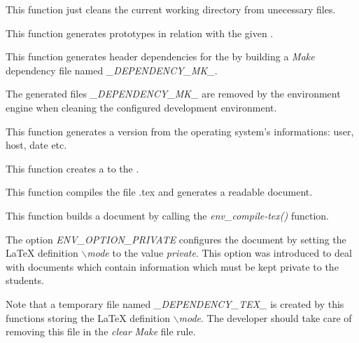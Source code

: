          {
	   This function just cleans the current working directory from
	   unecessary files.
	 }

         {
	   This function generates prototypes in relation with the given
	   .
	 }

         {
	   This function generates header dependencies for the 
	   by building a \textit{Make} dependency file named
	   \textit{\_DEPENDENCY\_MK\_}.

	   \-

	   The generated files \textit{\_DEPENDENCY\_MK\_} are removed by
	   the environment engine when cleaning the configured development
	   environment.
	 }

         {
	   This function generates a version  from the operating
	   system's informations: user, host, date etc.
	 }

         {
	   This function creates a  to the .
	 }

         {
	   This function compiles the file .tex and
	   generates a readable document.
	 }

         {
	   This function builds a document by calling the
           \textit{env\_compile-tex()} function.

	   \-

           The option \textit{ENV\_OPTION\_PRIVATE} configures the document
	   by setting the {\LaTeX} definition \textit{$\backslash$mode} to
	   the value \textit{private}. This option was introduced to deal with
	   documents which contain information which must be kept private to
	   the students.

	   \-

	   Note that a temporary file named \textit{\_DEPENDENCY\_TEX\_}
	   is created by this functions storing the {\LaTeX} definition
	   \textit{$\backslash$mode}. The developer should take care of
	   removing this file in the \textit{clear} \textit{Make} file rule.
	 }


